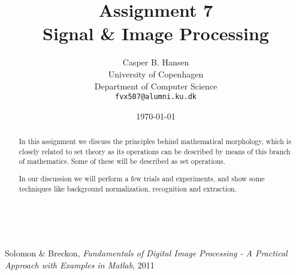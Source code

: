 \documentclass[11pt]{article}
\title
{
    {\Large Assignment 7} \\
    Signal \& Image Processing
}
\author
{
    Casper B. Hansen \\
    University of Copenhagen \\
    Department of Computer Science \\
    {\tt fvx507@alumni.ku.dk}
}
\date{\today}
\begin{document}
\maketitle
\thispagestyle{empty}
\begin{multicols}{2}
    \begin{abstract}
        In this assignment we discuss the principles behind mathematical
        morphology, which is closely related to set theory as its operations
        can be described by means of this branch of mathematics. Some of
        these will be described as set operations.
        
        In our discussion we will perform a few trials and experiments, and
        show some techniques like background normalization, recognition and
        extraction.
    \end{abstract}
    \vfill{\ }\columnbreak
    \tableofcontents
\end{multicols}
\clearpage








\appendix


\begin{thebibliography}{9}

    Solomon \& Breckon,
    \emph{Fundamentals of Digital Image Processing - A Practical Approach with
    Examples in Matlab},
    2011

\end{thebibliography}
\end{document}
